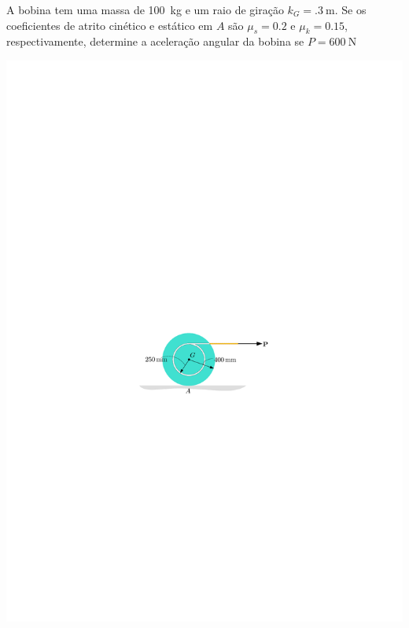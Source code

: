 \item A bobina tem uma massa de \SI{100}{\kilogram} e um raio de giração $k_{G}=\SI{.3}{\meter}$. Se os coeficientes de atrito cinético e estático em $A$ são $\mu_{s}=0.2$ e $\mu_{k}=0.15$, respectivamente, determine a aceleração angular da bobina se $P=\SI{600}{\newton}$


\begin{flushleft}
	\includegraphics[scale=1.2]{../../images/draw_10_1}
\end{flushleft}